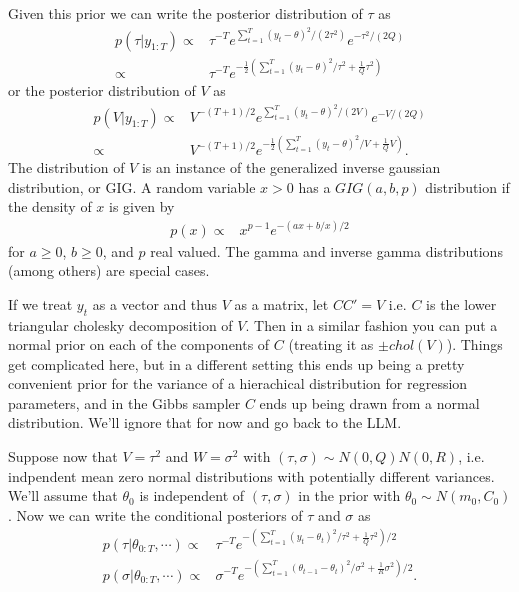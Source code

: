 \documentclass{article}\usepackage[]{graphicx}\usepackage[]{color}
\begin{document}
Given this prior we can write the posterior distribution of $\tau$ as
\begin{align*}
  p(\tau|y_{1:T}) \propto & \tau^{-T}e^{\sum_{t=1}^T(y_t - \theta)^2/(2\tau^2)}e^{-\tau^2/(2Q)}\\
  \propto & \tau^{-T}e^{-\frac{1}{2}\left(\sum_{t=1}^T(y_t-\theta)^2/\tau^2 + \frac{1}{Q}\tau^2\right)}
\end{align*}
or the posterior distribution of $V$ as
\begin{align*}
  p(V|y_{1:T}) \propto & V^{-(T+1)/2}e^{\sum_{t=1}^T(y_t - \theta)^2/(2V)}e^{-V/(2Q)}\\
  \propto & V^{-(T+1)/2}e^{-\frac{1}{2}\left(\sum_{t=1}^T(y_t-\theta)^2/V + \frac{1}{Q}V\right)}.
\end{align*}
The distribution of $V$ is an instance of the generalized inverse gaussian distribution, or GIG. A random variable $x>0$ has a $GIG(a,b,p)$ distribution if the density of $x$ is given by
\begin{align*}
  p(x) \propto & x^{p-1}e^{-(ax + b/x)/2}
\end{align*}
for $a\ge 0$, $b \ge 0$, and $p$ real valued. The gamma and inverse gamma distributions (among others) are special cases.

If we treat $y_t$ as a vector and thus $V$ as a matrix, let $CC'=V$ i.e. $C$ is the lower triangular cholesky decomposition of $V$. Then in a similar fashion you can put a normal prior on each of the components of $C$ (treating it as $\pm chol(V)$). Things get complicated here, but in a different setting this ends up being a pretty convenient prior for the variance of a hierachical distribution for regression parameters, and in the Gibbs sampler $C$ ends up being drawn from a normal distribution. We'll ignore that for now and go back to the LLM.

Suppose now that $V=\tau^2$ and $W=\sigma^2$ with $(\tau,\sigma)\sim N(0,Q)N(0,R)$, i.e. indpendent mean zero normal distributions with potentially different variances. We'll assume that $\theta_0$ is independent of $(\tau,\sigma)$ in the prior with $\theta_0\sim N(m_0,C_0)$. Now we can write the conditional posteriors of $\tau$ and $\sigma$ as
\begin{align*}
  p(\tau|\theta_{0:T},\cdots)\propto & \tau^{-T} e^{-\left(\sum_{t=1}^T(y_t-\theta_t)^2/\tau^2 + \frac{1}{Q}\tau^2\right)/2}\\
  p(\sigma|\theta_{0:T},\cdots)\propto & \sigma^{-T} e^{-\left(\sum_{t=1}^T(\theta_{t-1}-\theta_t)^2/\sigma^2 + \frac{1}{R}\sigma^2\right)/2}.
\end{align*}
\end{document}
